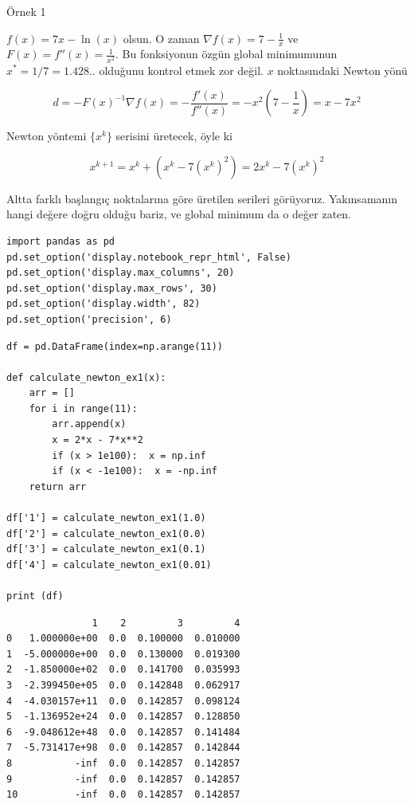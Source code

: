 \documentclass[12pt,fleqn]{article}\usepackage{../../common}
\begin{document}
Örnek 1

$f(x) = 7x - \ln(x)$ olsun. O zaman $\nabla f(x) = 7 - \frac{1}{x}$ ve
$F(x) = f''(x) = \frac{1}{x^2}$. Bu fonksiyonun özgün global minimumunun
$x^* = 1/7 = 1.428..$ olduğunu kontrol etmek zor değil. $x$ noktasındaki
Newton yönü

$$
d = -F(x)^{-1} \nabla f(x) = -\frac{f'(x)}{f''(x)} = 
-x^2 \left( 7 - \frac{1}{x}  \right)=
x - 7x^2
$$

Newton yöntemi $\{ x^k \}$ serisini üretecek, öyle ki

$$
x^{k+1} = x^k + ( x^k - 7(x^k)^2  ) = 2x^k - 7(x^k)^2
$$

Altta farklı başlangıç noktalarına göre üretilen serileri
görüyoruz. Yakınsamanın hangi değere doğru olduğu bariz, ve global minimum
da o değer zaten. 

\begin{verbatim}
import pandas as pd
pd.set_option('display.notebook_repr_html', False)
pd.set_option('display.max_columns', 20)
pd.set_option('display.max_rows', 30) 
pd.set_option('display.width', 82) 
pd.set_option('precision', 6)
\end{verbatim}

\begin{verbatim}
df = pd.DataFrame(index=np.arange(11))

def calculate_newton_ex1(x):
    arr = []
    for i in range(11):
        arr.append(x)
        x = 2*x - 7*x**2
        if (x > 1e100):  x = np.inf
        if (x < -1e100):  x = -np.inf
    return arr

df['1'] = calculate_newton_ex1(1.0)
df['2'] = calculate_newton_ex1(0.0)
df['3'] = calculate_newton_ex1(0.1)
df['4'] = calculate_newton_ex1(0.01)

print (df)    
\end{verbatim}

\begin{verbatim}
               1    2         3         4
0   1.000000e+00  0.0  0.100000  0.010000
1  -5.000000e+00  0.0  0.130000  0.019300
2  -1.850000e+02  0.0  0.141700  0.035993
3  -2.399450e+05  0.0  0.142848  0.062917
4  -4.030157e+11  0.0  0.142857  0.098124
5  -1.136952e+24  0.0  0.142857  0.128850
6  -9.048612e+48  0.0  0.142857  0.141484
7  -5.731417e+98  0.0  0.142857  0.142844
8           -inf  0.0  0.142857  0.142857
9           -inf  0.0  0.142857  0.142857
10          -inf  0.0  0.142857  0.142857
\end{verbatim}
\end{document}
